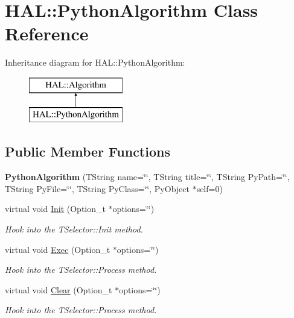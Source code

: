 \hypertarget{class_h_a_l_1_1_python_algorithm}{\section{H\+A\+L\+:\+:Python\+Algorithm Class Reference}
\label{class_h_a_l_1_1_python_algorithm}
}
Inheritance diagram for H\+A\+L\+:\+:Python\+Algorithm\+:\begin{figure}[H]
\begin{center}
\leavevmode
\includegraphics[height=2.000000cm]{class_h_a_l_1_1_python_algorithm}
\end{center}
\end{figure}
\subsection*{Public Member Functions}
\begin{DoxyCompactItemize}
\item 
\hypertarget{class_h_a_l_1_1_python_algorithm_a91ca9d7b2a002013b5dd27951aca3678}{{\bfseries Python\+Algorithm} (T\+String name=\char`\"{}\char`\"{}, T\+String title=\char`\"{}\char`\"{}, T\+String Py\+Path=\char`\"{}\char`\"{}, T\+String Py\+File=\char`\"{}\char`\"{}, T\+String Py\+Class=\char`\"{}\char`\"{}, Py\+Object $\ast$self=0)}\label{class_h_a_l_1_1_python_algorithm_a91ca9d7b2a002013b5dd27951aca3678}

\item 
virtual void \hyperlink{class_h_a_l_1_1_python_algorithm_a951c827d0f926b5096f7e59accc1e007}{Init} (Option\+\_\+t $\ast$options=\char`\"{}\char`\"{})
\begin{DoxyCompactList}\small\item\em Hook into the T\+Selector\+::\+Init method. \end{DoxyCompactList}\item 
virtual void \hyperlink{class_h_a_l_1_1_python_algorithm_a64a70202dd5da390ab6654a7e33c5976}{Exec} (Option\+\_\+t $\ast$options=\char`\"{}\char`\"{})
\begin{DoxyCompactList}\small\item\em Hook into the T\+Selector\+::\+Process method. \end{DoxyCompactList}\item 
virtual void \hyperlink{class_h_a_l_1_1_python_algorithm_aac72e398eadd979cf62617fe2fbe1a01}{Clear} (Option\+\_\+t $\ast$options=\char`\"{}\char`\"{})
\begin{DoxyCompactList}\small\item\em Hook into the T\+Selector\+::\+Process method. \end{DoxyCompactList}\end{DoxyCompactItemize}
